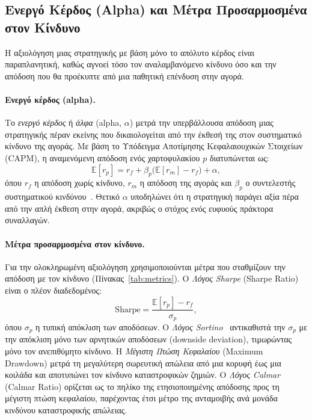\subsection{Ενεργό Κέρδος (Alpha) και Μέτρα Προσαρμοσμένα στον Κίνδυνο}
\label{subsec:alpha}

Η αξιολόγηση μιας στρατηγικής με βάση μόνο το απόλυτο κέρδος είναι παραπλανητική,
καθώς αγνοεί τόσο τον αναλαμβανόμενο κίνδυνο όσο και την απόδοση που θα
προέκυπτε από μια παθητική επένδυση στην αγορά.

\paragraph{Ενεργό κέρδος (alpha).}
Το \emph{ενεργό κέρδος} ή \emph{άλφα} (alpha,
$\alpha$) μετρά την υπερβάλλουσα απόδοση μιας στρατηγικής πέραν εκείνης που
δικαιολογείται από την έκθεσή της στον συστηματικό κίνδυνο της αγοράς. Με βάση
το Υπόδειγμα Αποτίμησης Κεφαλαιουχικών Στοιχείων
(CAPM), η αναμενόμενη απόδοση ενός χαρτοφυλακίου
$p$ διατυπώνεται ως:
\begin{equation}
    \mathbb{E}[r_p] = r_f + \beta_p\big(\mathbb{E}[r_m] - r_f\big) + \alpha,
    \label{eq:alpha}
\end{equation}
όπου $r_f$ η απόδοση χωρίς κίνδυνο, $r_m$ η απόδοση της αγοράς και $\beta_p$ ο
συντελεστής συστηματικού κινδύνου~\cite{jensen1968alpha}. Θετικό $\alpha$
υποδηλώνει ότι η στρατηγική παράγει αξία πέρα από την απλή έκθεση στην αγορά, 
ακριβώς ο στόχος ενός ευφυούς πράκτορα συναλλαγών.

\paragraph{Μέτρα προσαρμοσμένα στον κίνδυνο.}
Για την ολοκληρωμένη αξιολόγηση χρησιμοποιούνται μέτρα που σταθμίζουν την
απόδοση με τον κίνδυνο (Πίνακας~\ref{tab:metrics}). Ο \emph{Λόγος Sharpe}
(Sharpe Ratio)~\cite{sharpe1966} είναι ο
πλέον διαδεδομένος:
\begin{equation}
    \mathrm{Sharpe} = \frac{\mathbb{E}[r_p] - r_f}{\sigma_p},
    \label{eq:sharpe}
\end{equation}
όπου $\sigma_p$ η τυπική απόκλιση των αποδόσεων. Ο \emph{Λόγος Sortino}~\cite{sortino1991downside}
αντικαθιστά την $\sigma_p$ με την απόκλιση μόνο των αρνητικών αποδόσεων
(downside deviation), τιμωρώντας μόνο τον
ανεπιθύμητο κίνδυνο. Η \emph{Μέγιστη Πτώση Κεφαλαίου}
(Maximum Drawdown) μετρά τη μεγαλύτερη σωρευτική
απώλεια από μια κορυφή έως μια κοιλάδα και αποτυπώνει τον κίνδυνο
καταστροφικών ζημιών. Ο \emph{Λόγος Calmar} (Calmar Ratio) ορίζεται ως το
πηλίκο της ετησιοποιημένης απόδοσης προς τη μέγιστη πτώση κεφαλαίου, παρέχοντας
έτσι μέτρο της ανταμοιβής ανά μονάδα κινδύνου καταστροφικής απώλειας.

